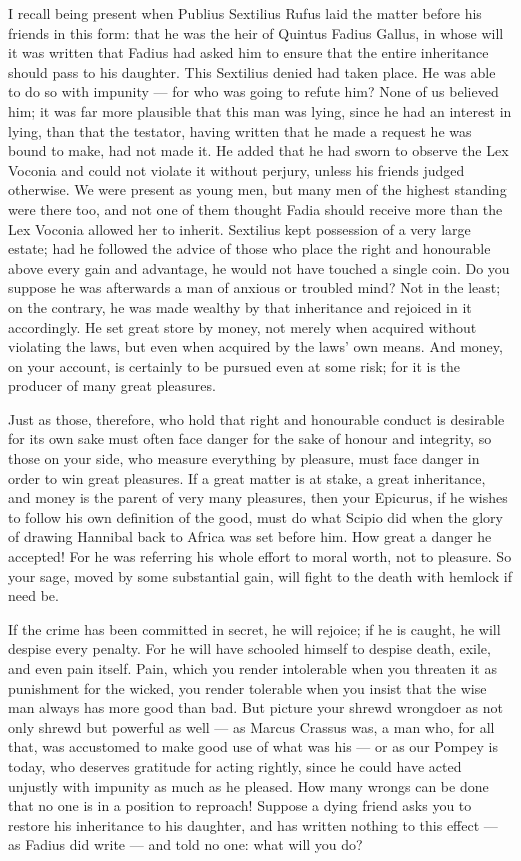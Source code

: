  I recall being present when Publius Sextilius Rufus laid the matter before his friends in this form: that he was the heir of Quintus Fadius Gallus, in whose will it was written that Fadius had asked him to ensure that the entire inheritance should pass to his daughter. This Sextilius denied had taken place. He was able to do so with impunity — for who was going to refute him? None of us believed him; it was far more plausible that this man was lying, since he had an interest in lying, than that the testator, having written that he made a request he was bound to make, had not made it. He added that he had sworn to observe the Lex Voconia and could not violate it without perjury, unless his friends judged otherwise. We were present as young men, but many men of the highest standing were there too, and not one of them thought Fadia should receive more than the Lex Voconia allowed her to inherit. Sextilius kept possession of a very large estate; had he followed the advice of those who place the right and honourable above every gain and advantage, he would not have touched a single coin. Do you suppose he was afterwards a man of anxious or troubled mind? Not in the least; on the contrary, he was made wealthy by that inheritance and rejoiced in it accordingly. He set great store by money, not merely when acquired without violating the laws, but even when acquired by the laws' own means. And money, on your account, is certainly to be pursued even at some risk; for it is the producer of many great pleasures.

 Just as those, therefore, who hold that right and honourable conduct is desirable for its own sake must often face danger for the sake of honour and integrity, so those on your side, who measure everything by pleasure, must face danger in order to win great pleasures. If a great matter is at stake, a great inheritance, and money is the parent of very many pleasures, then your Epicurus, if he wishes to follow his own definition of the good, must do what Scipio did when the glory of drawing Hannibal back to Africa was set before him. How great a danger he accepted! For he was referring his whole effort to moral worth, not to pleasure. So your sage, moved by some substantial gain, will fight to the death with hemlock if need be.

 If the crime has been committed in secret, he will rejoice; if he is caught, he will despise every penalty. For he will have schooled himself to despise death, exile, and even pain itself. Pain, which you render intolerable when you threaten it as punishment for the wicked, you render tolerable when you insist that the wise man always has more good than bad. But picture your shrewd wrongdoer as not only shrewd but powerful as well — as Marcus Crassus was, a man who, for all that, was accustomed to make good use of what was his — or as our Pompey is today, who deserves gratitude for acting rightly, since he could have acted unjustly with impunity as much as he pleased. How many wrongs can be done that no one is in a position to reproach! Suppose a dying friend asks you to restore his inheritance to his daughter, and has written nothing to this effect — as Fadius did write — and told no one: what will you do?

